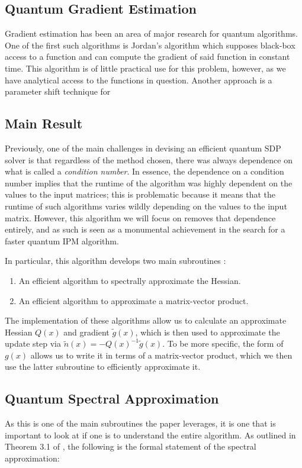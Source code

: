 \documentclass[11pt]{article}
\begin{document}
\subsection{Quantum Gradient Estimation}

Gradient estimation has been an area of major research for quantum algorithms. 
One of the first such algorithms is Jordan's algorithm \cite{} which supposes black-box access to a function 
and can compute the gradient of said function in constant time. 
This algorithm is of little practical use for this problem, 
however, as we have analytical access to the functions in question. Another approach is a parameter shift technique for 
 
 
\subsection{Main Result}
Previously, one of the main challenges in devising an efficient quantum SDP solver is that regardless of 
the method chosen, there was always dependence on what is called a \textit{condition number}. In essence, 
the dependence on a condition number implies that the runtime of the algorithm was highly dependent on the 
values to the input matrices; this is problematic because it means that the runtime of such algorithms 
varies wildly depending on the values to the input matrix. However, this algorithm we will focus on removes 
that dependence entirely, and as such is seen as a monumental achievement in the search for a faster 
quantum IPM algorithm. 

In particular, this algorithm develops two main subroutines \cite{}:
\begin{enumerate}[label=\alph*)]
	\item An efficient algorithm to spectrally approximate the Hessian. 
	\item An efficient algorithm to approximate a matrix-vector product. 
\end{enumerate}
The implementation of these algorithms allow us to calculate an approximate Hessian \( Q(x) \) and gradient 
\( \tilde g(x) \), which is then used to approximate the update step via \( \tilde n(x) = -Q(x)^{-1} \tilde g(x) \).
To be more specific, the form of \( g(x) \) allows us to write it in terms of a matrix-vector product, which we 
then use the latter subroutine to efficiently approximate it. 

\subsection{Quantum Spectral Approximation}
As this is one of the main subroutines the paper leverages, it is one that is important to look at if one is to 
understand the entire algorithm. As outlined in Theorem 3.1 of \cite{}, 
the following is the formal statement of the spectral 
approximation:
\end{document}
